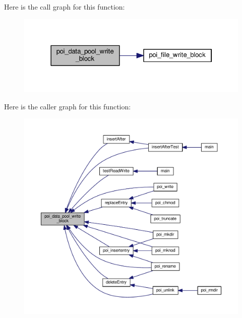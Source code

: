 Here is the call graph for this function\-:\nopagebreak
\begin{figure}[H]
\begin{center}
\leavevmode
\includegraphics[width=322pt]{data-pool-block-manager_8h_a10624f1cbc61dd0a8a03aa94d8502567_cgraph}
\end{center}
\end{figure}




Here is the caller graph for this function\-:
\nopagebreak
\begin{figure}[H]
\begin{center}
\leavevmode
\includegraphics[width=350pt]{data-pool-block-manager_8h_a10624f1cbc61dd0a8a03aa94d8502567_icgraph}
\end{center}
\end{figure}


